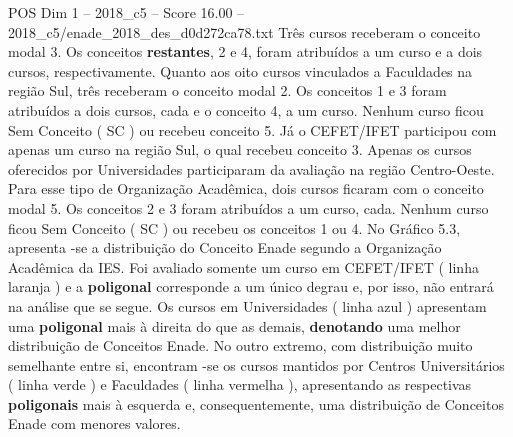 \begin{textsample}{POS Dim 1 – 2018\_c5 – Score 16.00 – 2018\_c5/enade\_2018\_des\_d0d272ca78.txt}
Três cursos receberam o conceito modal 3.
Os conceitos \textbf{restantes}, 2 e 4, foram atribuídos a um curso e a dois cursos, respectivamente.
Quanto aos oito cursos vinculados a Faculdades na região Sul, três receberam o conceito modal 2.
Os conceitos 1 e 3 foram atribuídos a dois cursos, cada e o conceito 4, a um curso.
Nenhum curso ficou Sem Conceito ( SC ) ou recebeu conceito 5.
Já o CEFET/IFET participou com apenas um curso na região Sul, o qual recebeu conceito 3.
Apenas os cursos oferecidos por Universidades participaram da avaliação na região Centro-Oeste.
Para esse tipo de Organização Acadêmica, dois cursos ficaram com o conceito modal 5.
Os conceitos 2 e 3 foram atribuídos a um curso, cada.
Nenhum curso ficou Sem Conceito ( SC ) ou recebeu os conceitos 1 ou 4.
No Gráfico 5.3, apresenta -se a distribuição do Conceito Enade segundo a Organização Acadêmica da IES.
Foi avaliado somente um curso em CEFET/IFET ( linha laranja ) e a \textbf{poligonal} corresponde a um único degrau e, por isso, não entrará na análise que se segue.
Os cursos em Universidades ( linha azul ) apresentam uma \textbf{poligonal} mais à direita do que as demais, \textbf{denotando} uma melhor distribuição de Conceitos Enade.
No outro extremo, com distribuição muito semelhante entre si, encontram -se os cursos mantidos por Centros Universitários ( linha verde ) e Faculdades ( linha vermelha ), apresentando as respectivas \textbf{poligonais} mais à esquerda e, consequentemente, uma distribuição de Conceitos Enade com menores valores.

\end{textsample}
